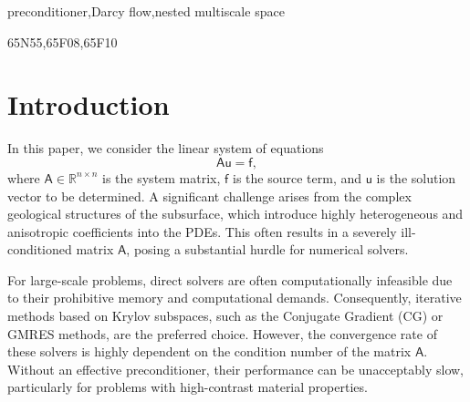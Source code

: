 \documentclass[preprint,12pt]{elsarticle}
\begin{document}
\begin{frontmatter}


    \begin{keyword}
      preconditioner\sep Darcy flow\sep nested multiscale space


      \MSC 65N55\sep 65F08\sep 65F10
    \end{keyword}
  \end{frontmatter}

  \section{Introduction}
  \label{sec:introduction}

  In this paper, we consider the linear system of equations
  \begin{equation}
    \label{eq:matrix-form}\mathsf{A}\mathsf{u}= \mathsf{f},
  \end{equation}
  where $\mathsf{A}\in \mathbb{R}^{n \times n}$ is the system matrix, $\mathsf{f}$
  is the source term, and $\mathsf{u}$ is the solution vector to be determined. A
  significant challenge arises from the complex geological structures of the subsurface,
  which introduce highly heterogeneous and anisotropic coefficients into the
  PDEs. This often results in a severely ill-conditioned matrix $\mathsf{A}$,
  posing a substantial hurdle for numerical solvers.

  For large-scale problems, direct solvers are often computationally infeasible due
  to their prohibitive memory and computational demands. Consequently, iterative
  methods based on Krylov subspaces, such as the Conjugate Gradient (CG) or
  GMRES methods, are the preferred choice. However, the convergence rate of these
  solvers is highly dependent on the condition number of the matrix $\mathsf{A}$.
  Without an effective preconditioner, their performance can be unacceptably slow,
  particularly for problems with high-contrast material properties.
\end{document}
